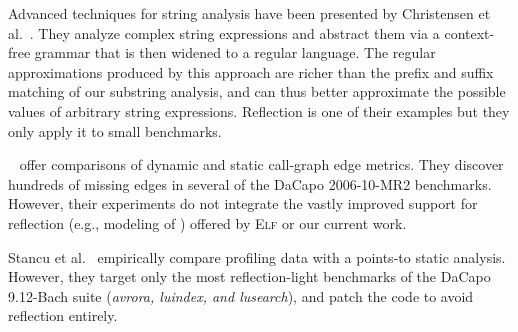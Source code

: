 Advanced techniques for string analysis have been presented by
Christensen et al.~\cite{sas/ChristensenMS03}. They analyze complex
string expressions and abstract them via a context-free grammar that
is then widened to a regular language. The regular approximations
produced by this approach are richer than the prefix and suffix
matching of our substring analysis, and can thus better approximate
the possible values of arbitrary string expressions. Reflection is one
of their examples but they only apply it to small benchmarks.

\citeauthor{ecoop/AliL12}~\cite{ecoop/AliL12,ecoop/AliL13} offer
comparisons of dynamic and static call-graph edge metrics.  They
discover hundreds of missing edges in several of the DaCapo
2006-10-MR2 benchmarks.  However, their experiments do not integrate
the vastly improved support for reflection (e.g., modeling of
) offered by \textsc{Elf} or our
current work.

Stancu et al.~\cite{pppj/StancuWBLF14} empirically
compare profiling data with a points-to static analysis.
However, they target only the most reflection-light benchmarks of the
DaCapo 9.12-Bach suite (\emph{avrora, luindex, and lusearch}), and
patch the code to avoid reflection entirely.



